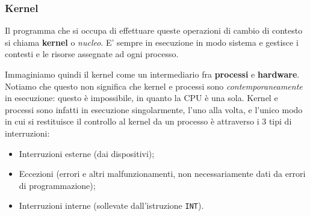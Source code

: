\documentclass[a4paper,11pt]{article}
\begin{document}
\subsubsection{Kernel}
Il programma che si occupa di effettuare queste operazioni di cambio di contesto si chiama \textbf{kernel} o \textit{nucleo}.
E' sempre in esecuzione in modo sistema e gestisce i contesti e le risorse assegnate ad ogni processo.

Immaginiamo quindi il kernel come un intermediario fra \textbf{processi} e \textbf{hardware}.
Notiamo che questo non significa che kernel e processi sono \textit{contemporaneamente} in esecuzione: questo è impossibile, in quanto la CPU è una sola.
Kernel e processi sono infatti in esecuzione singolarmente, l'uno alla volta, e l'unico modo in cui si restituisce il controllo al kernel da un processo è attraverso i 3 tipi di interruzioni:
\begin{itemize}
	\item Interruzioni esterne (dai dispositivi);
	\item Eccezioni (errori e altri malfunzionamenti, non necessariamente dati da errori di programmazione);
	\item Interruzioni interne (sollevate dall'istruzione \lstinline|INT|).
\end{itemize}
\end{document}
